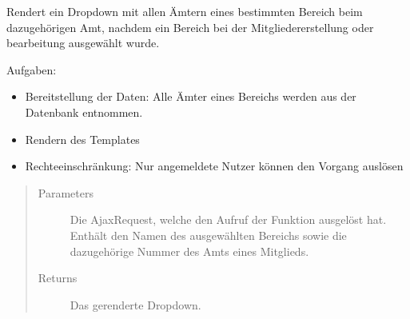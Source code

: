 \documentclass[letterpaper,10pt,english]{sphinxmanual}
\begin{document}
\begin{fulllineitems}
\label{\detokenize{masterCodeDoc:mitglieder.views.funktionen_laden}}
Rendert ein Dropdown mit allen Ämtern eines bestimmten Bereich beim dazugehörigen Amt, nachdem ein Bereich bei der Mitgliedererstellung oder \sphinxhyphen{}bearbeitung ausgewählt wurde.

Aufgaben:
\begin{itemize}
\item {} 
Bereitstellung der Daten: Alle Ämter eines Bereichs werden aus der Datenbank entnommen.

\item {} 
Rendern des Templates

\item {} 
Rechteeinschränkung: Nur angemeldete Nutzer können den Vorgang auslösen

\end{itemize}
\begin{quote}\begin{description}
\item[{Parameters}] \leavevmode
{} \textendash{} Die Ajax\sphinxhyphen{}Request, welche den Aufruf der Funktion ausgelöst hat. Enthält den Namen des ausgewählten Bereichs sowie die dazugehörige Nummer des Amts eines Mitglieds.

\item[{Returns}] \leavevmode
Das gerenderte Dropdown.

\end{description}\end{quote}

\end{fulllineitems}


\begin{fulllineitems}
\label{\detokenize{masterCodeDoc:mitglieder.views.funktionen_max_member_ueberpruefen}}
\end{fulllineitems}
\end{document}
